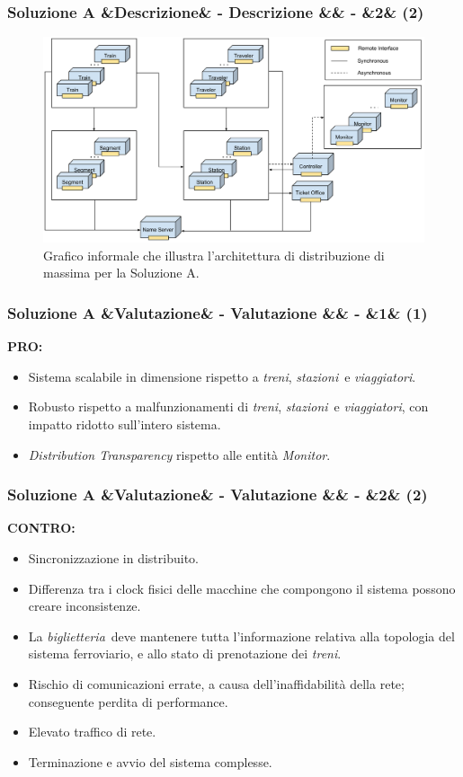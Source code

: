 \documentclass[slidestop,compress,blackandwhite]{beamer}
\newcommand{\ii}[1]{\textit{#1}}
\newcommand{\treni}{\ii{treni}}
\newcommand{\viaggiatori}{\ii{viaggiatori}}
\newcommand{\stazioni}{\ii{stazioni}}
\newcommand{\biglietteria}{\ii{biglietteria}}
\newcommand{\PRO}{\textbf{PRO:}}
\newcommand{\CONTRO}{\textbf{CONTRO:}}
\newcommand{\newtitle}[4]{
	#1 
	\ifx&#2&%
	\else
  		\large- #2
	\fi
	\ifx&#3&%
	\else
  		\normalsize- #3
	\fi
	\ifx&#4&%
	\else
  		\normalsize (#4)
	\fi
}
\newcommand{\newframe}[5]{
	\begin{frame}
		\frametitle{\newtitle{#1}{#2}{#3}{#4}}
		#5
	\end{frame}
}
\begin{document}
	\newframe{Soluzione A}{Descrizione}{}{2}{
		\begin{figure}
			\includegraphics[scale=0.24,trim=0mm 5mm 0mm 35mm]{imgs/All_distributed.pdf}
			\caption{\scriptsize Grafico informale che illustra l'architettura di distribuzione di massima per la Soluzione A.}
		\end{figure}
	}
	
			
	
	\newframe{Soluzione A}{Valutazione}{}{1}{
		\PRO
			\begin{itemize}
				\item Sistema scalabile in dimensione rispetto a \treni, \stazioni~e \viaggiatori.
				\item Robusto rispetto a malfunzionamenti di \treni, \stazioni~e \viaggiatori, con impatto ridotto sull'intero sistema.
				\item \ii{Distribution Transparency} rispetto alle entità \ii{Monitor}.
			\end{itemize}
		
	}

	\newframe{Soluzione A}{Valutazione}{}{2}{
		\CONTRO
			\begin{itemize}
				\item Sincronizzazione in distribuito.
				\item Differenza tra i clock fisici delle macchine che compongono il sistema possono creare inconsistenze.
				\item La \biglietteria~deve mantenere tutta l'informazione relativa alla topologia del sistema ferroviario, e allo stato di prenotazione dei \treni.
				\item Rischio di comunicazioni errate, a causa dell'inaffidabilità della rete; conseguente perdita di performance. 
				\item Elevato traffico di rete.
				\item Terminazione e avvio del sistema complesse.
			\end{itemize}
	}
	
\end{document}
